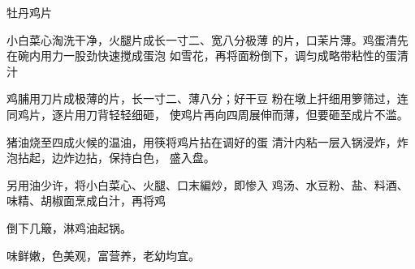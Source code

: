 \begin{recipe}{牡丹鸡片}

\ingredients



\cooking

\step 小白菜心淘洗干净，火腿片成长一寸二、宽八分极薄 的片，口茉片薄。鸡蛋清先在碗内用力一股劲快速搅成蛋泡 如雪花，再将面粉倒下，调匀成略带粘性的蛋清汁

\step 鸡脯用刀片成极薄的片，长一寸二、薄八分；好干豆 粉在墩上扞细用箩筛过，连同鸡片，逐片用刀背轻轻细砸， 使鸡片再向四周展伸而薄，但要砸至成片不滥。

\step 猪油烧至四成火候的温油，用筷将鸡片拈在调好的蛋 清汁内粘一层入锅浸炸，炸泡拈起，边炸边拈，保持白色， 盛入盘。

\step 另用油少许，将小白菜心、火腿、口末編炒，即惨入 鸡汤、水豆粉、盐、料酒、味精、胡椒面烹成白汁，再将鸡

倒下几簸，淋鸡油起锅。

\notes

味鲜嫩，色美观，富营养，老幼均宜。

\end{recipe}

